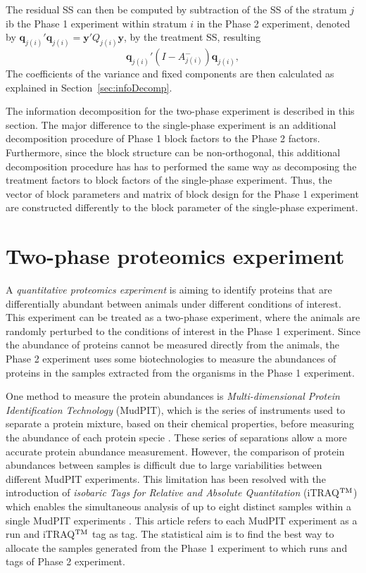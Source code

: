 \documentclass[article]{jss}
\begin{document}
The residual SS can then be computed by subtraction of the SS of the stratum $j$ ib the Phase 1 experiment within stratum $i$ in the Phase 2 experiment, denoted by $\bm{q}_{j(i)}'\bm{q}_{j(i)} = \bm{y}' Q_{j(i)} \bm{y}$, by the treatment SS, resulting
\[
\bm{q}_{j(i)}' (I - A_{j(i)}^{-}) \bm{q}_{j(i)},
\]
The coefficients of the variance and fixed components are then calculated as explained in Section~\ref{sec:infoDecomp}.

The information decomposition for the two-phase experiment is described in this section. The major difference to the single-phase experiment is an additional decomposition procedure of Phase 1 block factors to the Phase 2 factors. Furthermore, since the block structure can be non-orthogonal, this additional decomposition procedure has has to performed the same way as decomposing the treatment factors to block factors of the single-phase experiment. Thus, the vector of block parameters and matrix of block design for the Phase 1 experiment are constructed differently to the block parameter of the single-phase experiment.  

\section{Two-phase proteomics experiment} 
\label{sec:exampleTwoPase}
A \emph{quantitative proteomics experiment} is aiming to identify proteins that are differentially abundant between animals under different conditions of interest. This experiment can be treated as a two-phase experiment, where the animals are randomly perturbed to the conditions of interest in the Phase 1 experiment. Since the abundance of proteins cannot be measured directly from the animals, the Phase 2 experiment uses some biotechnologies to measure the abundances of proteins in the samples extracted from the organisms in the Phase 1 experiment. 

One method to measure the protein abundances is \emph{Multi-dimensional Protein Identification Technology} (MudPIT), which is the series of instruments used to separate a protein mixture, based on their chemical properties, before measuring the abundance of each protein specie \citep{Florens2006a}. These series of separations allow a more accurate protein abundance measurement. However, the comparison of protein abundances between samples is difficult due to large variabilities between different MudPIT experiments. This limitation has been resolved with the introduction of \emph{isobaric Tags for Relative and Absolute Quantitation} (iTRAQ$^{\rm TM}$) which enables the simultaneous analysis of up to eight distinct samples within a single MudPIT experiments \citep{Ross2004, Choe2007}. This article refers to each MudPIT experiment as a run and iTRAQ$^{\rm TM}$ tag as tag. The statistical aim is to find the best way to allocate the samples generated from the Phase 1 experiment to which runs and tags of Phase 2 experiment.
\end{document}
